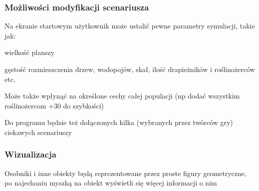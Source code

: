 \subsubsection*{Możliwości modyfikacji scenariusza}

Na ekranie startowym użytkownik może ustalić pewne parametry symulacji, takie jak\-:


\begin{DoxyItemize}
\item wielkość planszy
\end{DoxyItemize}


\begin{DoxyItemize}
\item gęstość rozmieszczenia drzew, wodopojów, skał, ilość drapieżników i roślinożerców etc,
\end{DoxyItemize}

Może także wpłynąć na określone cechy całej populacji (np dodać wszystkim roślinożercom +30 do szybkości)

Do programu będzie też dołączonych kilka (wybranych przez twórców gry) ciekawych scenariuszy

\subsubsection*{Wizualizacja}

Osobniki i inne obiekty będą reprezentowane przez proste figury geometryczne, po najechaniu myszką na obiekt wyświetli się więcej informacji o nim 